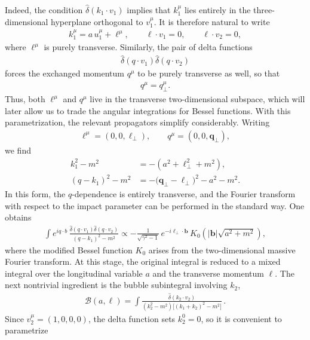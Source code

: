 Indeed, the condition $\hat\delta(k_1\!\cdot\! v_1)$ implies that $k_1^\mu$ lies entirely in the three-dimensional hyperplane orthogonal to $v_1^\mu$. It is therefore natural to write
\begin{align}
k_1^\mu=a\,u_1^\mu+\ell^\mu,
\qquad
\ell\cdot v_1=0,
\qquad
\ell\cdot v_2=0,
\end{align}
where $\ell^\mu$ is purely transverse. Similarly, the pair of delta functions
\begin{align}
\hat\delta(q\!\cdot\! v_1)\hat\delta(q\!\cdot\! v_2)
\end{align}
forces the exchanged momentum $q^\mu$ to be purely transverse as well, so that
\begin{align}
q^\mu=q_\perp^\mu.
\end{align}
Thus, both $\ell^\mu$ and $q^\mu$ live in the transverse two-dimensional subspace, which will later allow us to trade the angular integrations for Bessel functions. With this parametrization, the relevant propagators simplify considerably. Writing
\begin{align}
\ell^\mu=(0,0,\boldsymbol{\ell}_\perp),
\qquad
q^\mu=(0,0,\boldsymbol{q}_\perp),
\end{align}
we find
\begin{align}
k_1^2-m^2
&=-(a^2+\boldsymbol{\ell}_\perp^2+m^2),\\
(q-k_1)^2-m^2
&=-\bigl(\boldsymbol{q}_\perp-\boldsymbol{\ell}_\perp\bigr)^2-a^2-m^2.
\end{align}
In this form, the $q$-dependence is entirely transverse, and the Fourier transform with respect to the impact parameter can be performed in the standard way. One obtains
\begin{align}
\int e^{iq\cdot b}\,
\frac{\hat\delta(q\!\cdot\! v_1)\hat\delta(q\!\cdot\! v_2)}
{(q-k_1)^2-m^2}
\propto
-\frac{1}{\sqrt{\gamma^2-1}}\,
e^{-i\boldsymbol{\ell}_\perp\cdot\boldsymbol{b}}\,
K_0\!\left(|\boldsymbol{b}|\sqrt{a^2+m^2}\right),
\end{align}
where the modified Bessel function $K_0$ arises from the two-dimensional massive Fourier transform. At this stage, the original integral is reduced to a mixed integral over the longitudinal variable $a$ and the transverse momentum $\ell$. The next nontrivial ingredient is the bubble subintegral involving $k_2$,
\begin{align}
\mathcal{B}(a,\ell)
=
\int
\frac{\hat\delta(k_2\!\cdot\! v_2)}
{(k_2^2-m^2)\bigl[(k_1+k_2)^2-m^2\bigr]}\,.
\end{align}
Since $v_2^\mu=(1,0,0,0)$, the delta function sets $k_2^0=0$, so it is convenient to parametrize
